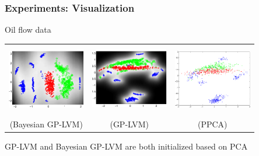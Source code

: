 \documentclass{beamer}
\begin{document}
\frame
{
\frametitle{Experiments: Visualization}

Oil flow data

\begin{center}
\begin{tabular}{ccc}
\includegraphics[width=34mm,height=30.5mm]
{../../../vargplvm/tex/diagrams/demOilVargplvm1} &
\includegraphics[width=34mm,height=30.5mm]
{../../../vargplvm/tex/diagrams/demOilFgplvm7} &
\includegraphics[width=34mm,height=30.5mm]
{../../../vargplvm/tex/diagrams/pcaOil}\\
(Bayesian GP-LVM) & (GP-LVM) & (PPCA)
\end{tabular}
\end{center}


GP-LVM and Bayesian GP-LVM are both initialized based on PCA


}
\end{document}
